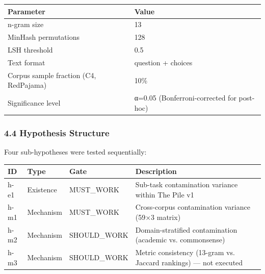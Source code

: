 \begin{table}[htbp]
\centering
\begin{tabular}{ll}
\toprule
Parameter & Value \\
\midrule
n-gram size & 13 \\
MinHash permutations & 128 \\
LSH threshold & 0.5 \\
Text format & question + choices \\
Corpus sample fraction (C4, RedPajama) & 10\% \\
Significance level & α=0.05 (Bonferroni-corrected for post-hoc) \\
\bottomrule
\end{tabular}
\end{table}

\subsubsection{4.4 Hypothesis Structure}

Four sub-hypotheses were tested sequentially:

\begin{table}[htbp]
\centering
\begin{tabular}{llll}
\toprule
ID & Type & Gate & Description \\
\midrule
h-e1 & Existence & MUST_WORK & Sub-task contamination variance within The Pile v1 \\
h-m1 & Mechanism & MUST_WORK & Cross-corpus contamination variance (59×3 matrix) \\
h-m2 & Mechanism & SHOULD_WORK & Domain-stratified contamination (academic vs. commonsense) \\
h-m3 & Mechanism & SHOULD_WORK & Metric consistency (13-gram vs. Jaccard rankings) — not executed \\
\bottomrule
\end{tabular}
\end{table}

